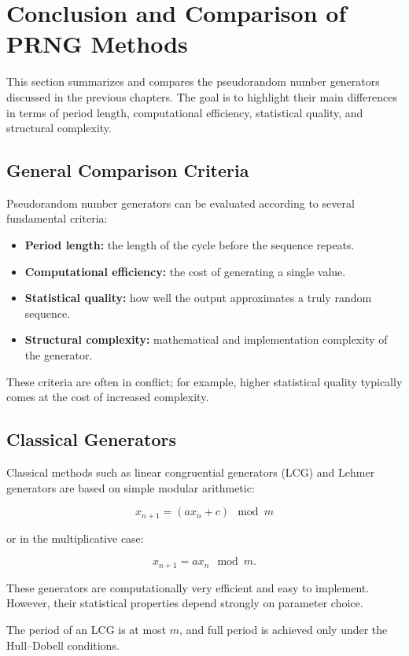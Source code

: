 \section{Conclusion and Comparison of PRNG Methods}

This section summarizes and compares the pseudorandom number generators discussed in the previous chapters. The goal is to highlight their main differences in terms of period length, computational efficiency, statistical quality, and structural complexity.

\subsection{General Comparison Criteria}

Pseudorandom number generators can be evaluated according to several fundamental criteria:

\begin{itemize}
    \item \textbf{Period length:} the length of the cycle before the sequence repeats.
    \item \textbf{Computational efficiency:} the cost of generating a single value.
    \item \textbf{Statistical quality:} how well the output approximates a truly random sequence.
    \item \textbf{Structural complexity:} mathematical and implementation complexity of the generator.
\end{itemize}

These criteria are often in conflict; for example, higher statistical quality typically comes at the cost of increased complexity.

\subsection{Classical Generators}

Classical methods such as linear congruential generators (LCG) and Lehmer generators are based on simple modular arithmetic:

$$
x_{n+1} = (ax_n + c) \mod m
$$

or in the multiplicative case:

$$
x_{n+1} = ax_n \mod m.
$$

These generators are computationally very efficient and easy to implement. However, their statistical properties depend strongly on parameter choice.

The period of an LCG is at most $m$, and full period is achieved only under the Hull--Dobell conditions.


